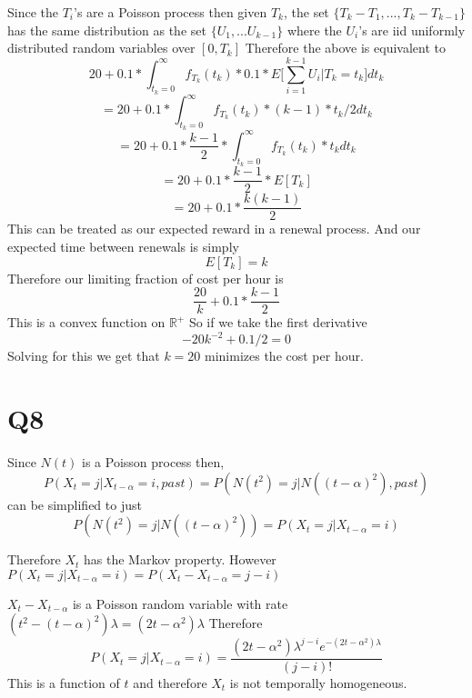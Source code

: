 \documentclass{article}
\begin{document}
Since the $T_i$'s are a Poisson process then given $T_k$, the set
$\{T_k - T_1,..., T_k - T_{k-1}\}$ has the same distribution as the set $\{U_1, ... U_{k-1}\}$ where the $U_i$'s are iid uniformly distributed random variables over $[0,T_k]$
Therefore the above is equivalent to 
$$
20 + 0.1 * \int_{t_k = 0} ^ \infty f_{T_k}(t_k) * 0.1*E\bigg[ \sum_{i = 1}^{k-1} U_i \bigg| T_k = t_k\bigg] dt_k
$$
$$
= 20 + 0.1 * \int_{t_k = 0} ^ \infty f_{T_k}(t_k) * (k-1) * t_k/2 dt_k
$$
$$
= 20 + 0.1 * \frac{k-1}{2}*\int_{t_k = 0} ^ \infty f_{T_k}(t_k) * t_k dt_k
$$
$$
= 20 + 0.1* \frac{k-1}{2}*E[T_k]
$$
$$
= 20 + 0.1 * \frac{k(k-1)}{2}
$$
This can be treated as our expected reward in a renewal process. And our expected time between renewals is simply
$$
E[T_k] = k
$$
Therefore our limiting fraction of cost per hour is
$$
\frac{20}{k} + 0.1*\frac{k-1}{2}
$$
This is a convex function on $\mathbb{R}^+$
So if we take the first derivative
$$
-20k^{-2} + 0.1/2 = 0
$$
Solving for this we get that $k = 20$ minimizes the cost per hour. 

\section*{Q8}
Since $N(t)$ is a Poisson process then,
$$
P(X_t = j | X_{t-\alpha} = i, past) = P(N(t^2) = j | N((t-\alpha)^2), past)
$$
can be simplified to just
$$
P(N(t^2) = j | N((t-\alpha)^2)) = P(X_t = j | X_{t-\alpha} = i)
$$

Therefore $X_t$ has the Markov property.
However
$
P(X_t = j | X_{t-\alpha} = i) = P(X_t - X_{t-\alpha} = j-i)
$

$X_t - X_{t-\alpha}$ is a Poisson random variable with rate $(t^2 - (t-\alpha)^2)\lambda = (2t-\alpha^2)\lambda$
Therefore 
$$
P(X_t = j | X_{t-\alpha} = i) = \frac{(2t-\alpha^2)\lambda^{j-i}e^{-(2t-\alpha^2)\lambda}}{(j-i)!}
$$
This is a function of $t$ and therefore $X_t$ is not temporally homogeneous. 
\end{document}
